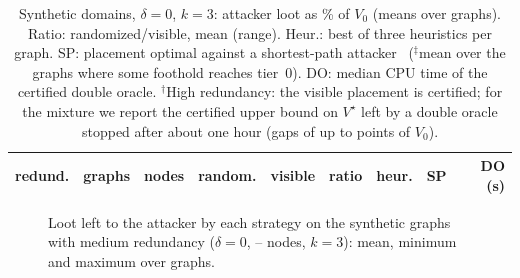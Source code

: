 \documentclass[runningheads]{llncs}
\begin{document}
\begin{table}[t]
\centering
\caption{Synthetic domains, $\delta=0$, $k=3$: attacker loot as \% of $V_0$ (means over graphs). Ratio: randomized/visible, mean (range). Heur.: best of three heuristics per graph. SP: placement optimal against a shortest-path attacker~\cite{ngo2024catch} ($^\ddagger$mean over the graphs where some foothold reaches tier~0). DO: median CPU time of the certified double oracle. $^\dagger$High redundancy: the visible placement is certified; for the mixture we report the certified upper bound on $V^\star$ left by a double oracle stopped after about one hour (gaps of up to \AltaGapMax{} points of $V_0$).}\label{tab:synth}
\small\setlength{\tabcolsep}{3pt}
\begin{tabular}{lrrrrcrrr}
\toprule
redund. & graphs & nodes & random. & visible & ratio & heur. & SP & DO (s)\\
\midrule
\end{tabular}
\end{table}

\begin{figure}[t]
\centering
{}\stratdata
{}
\caption{Loot left to the attacker by each strategy on the \NMain{} synthetic graphs with medium redundancy ($\delta=0$, \NodesMinMain--\NodesMaxMain{} nodes, $k=3$): mean, minimum and maximum over graphs.}\label{fig:strategies}
\end{figure}
\end{document}
